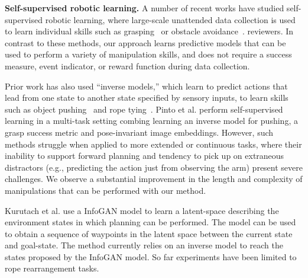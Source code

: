 \noindent \textbf{Self-supervised robotic learning.}
A number of recent works have studied self-supervised robotic learning, where large-scale unattended data collection is used to learn individual skills such as grasping~\cite{mottaghi2016happens, lerrel,google_handeye} or obstacle avoidance~\cite{greg_kahn_uncertainty,crashing}. 
 reviewers. 
In contrast to these methods, our approach learns predictive models that can be used to perform a variety of manipulation skills, and does not require a success measure, event indicator, or reward function during data collection. 

Prior work has also used ``inverse models,'' which learn to predict actions that lead from one state to another state specified by sensory inputs, to learn skills such as object pushing~\cite{agrawal2016learning} and rope tying~\cite{nair2017combining}.
Pinto et al. \cite{pinto2016curious} perform self-supervised learning in a multi-task setting combing learning an inverse model for pushing, a grasp success metric and pose-invariant image embeddings.
However, such methods struggle when applied to more extended or continuous tasks, where their inability to support forward planning and tendency to pick up on extraneous distractors (e.g., predicting the action just from observing the arm) present severe challenges. We observe a substantial improvement in the length and complexity of manipulations that can be performed with our method.

Kurutach et al. use a InfoGAN model \cite{kurutach2018learning} to learn a latent-space describing the environment states in which planning can be performed. The model can be used to obtain a sequence of waypoints in the latent space between the current state and goal-state. The method currently relies on an inverse model to reach the states proposed by the InfoGAN model. So far experiments have been limited to rope rearrangement tasks.

